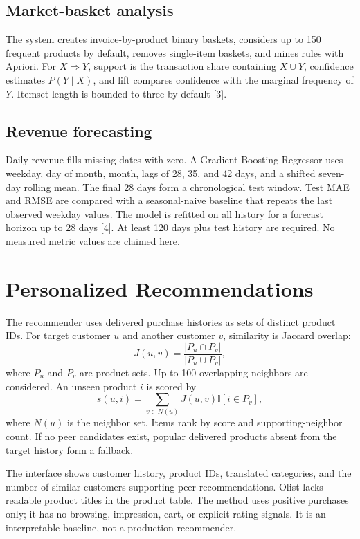 \documentclass[conference]{IEEEtran}
\begin{document}
\subsection{Market-basket analysis}
The system creates invoice-by-product binary baskets, considers up to 150 frequent products by default, removes single-item baskets, and mines rules with Apriori. For $X\Rightarrow Y$, support is the transaction share containing $X\cup Y$, confidence estimates $P(Y\mid X)$, and lift compares confidence with the marginal frequency of $Y$. Itemset length is bounded to three by default [3].
\subsection{Revenue forecasting}
Daily revenue fills missing dates with zero. A Gradient Boosting Regressor uses weekday, day of month, month, lags of 28, 35, and 42 days, and a shifted seven-day rolling mean. The final 28 days form a chronological test window. Test MAE and RMSE are compared with a seasonal-naive baseline that repeats the last observed weekday values. The model is refitted on all history for a forecast horizon up to 28 days [4]. At least 120 days plus test history are required. No measured metric values are claimed here.
\section{Personalized Recommendations}
The recommender uses delivered purchase histories as sets of distinct product IDs. For target customer $u$ and another customer $v$, similarity is Jaccard overlap:
\begin{equation}
J(u,v)=\frac{|P_u\cap P_v|}{|P_u\cup P_v|},
\end{equation}
where $P_u$ and $P_v$ are product sets. Up to 100 overlapping neighbors are considered. An unseen product $i$ is scored by
\begin{equation}
s(u,i)=\sum_{v\in N(u)}J(u,v)\mathbb{I}[i\in P_v],
\end{equation}
where $N(u)$ is the neighbor set. Items rank by score and supporting-neighbor count. If no peer candidates exist, popular delivered products absent from the target history form a fallback.

The interface shows customer history, product IDs, translated categories, and the number of similar customers supporting peer recommendations. Olist lacks readable product titles in the product table. The method uses positive purchases only; it has no browsing, impression, cart, or explicit rating signals. It is an interpretable baseline, not a production recommender.
\end{document}
